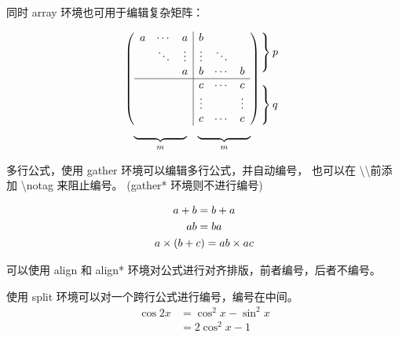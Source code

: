 \documentclass[UTF8]{ctexart}   %
\begin{document}
    同时 array 环境也可用于编辑复杂矩阵：

    \[
    \begin{array}{c@{\hspace{-5pt}}l}
        \left(
            \begin{array}{ccc|ccc}
                a & \cdots & a & b & &  \\
                & \ddots & \vdots & \vdots & \ddots & \\
                & & a & b & \cdots & b \\ \hline
                & & & c & \cdots & c \\
                & & & \vdots & & \vdots \\
                & & & c & \cdots & c \\
            \end{array}
        \right) & 
        \begin{array}{l}
            \left.\rule{0mm}{7mm}\right\}p\\    %
            \\ 
            \left.\rule{0mm}{7mm}\right\}q
        \end{array} \\
        \begin{array}{cc}
            \underbrace{\rule{17mm}{0mm}}_m &   %
            \underbrace{\rule{17mm}{0mm}}_m 
        \end{array} & \\
    \end{array}
    \]
    
    多行公式，使用 gather 环境可以编辑多行公式，并自动编号，
    也可以在 \textbackslash\textbackslash 前添加 \textbackslash notag 来阻止编号。
    (gather* 环境则不进行编号)

    \begin{gather}
        a+b=b+a \\
        ab = ba \notag \\
        a \times (b+c) = ab \times ac 
    \end{gather}
    
    可以使用 align 和 align* 环境对公式进行对齐排版，前者编号，后者不编号。

    使用 split 环境可以对一个跨行公式进行编号，编号在中间。
    \begin{equation}
        \begin{split}
            \cos 2x & = \cos^2 x - \sin^2 x \\
            & = 2\cos^2 x - 1
        \end{split}
    \end{equation}
    
\end{document}
